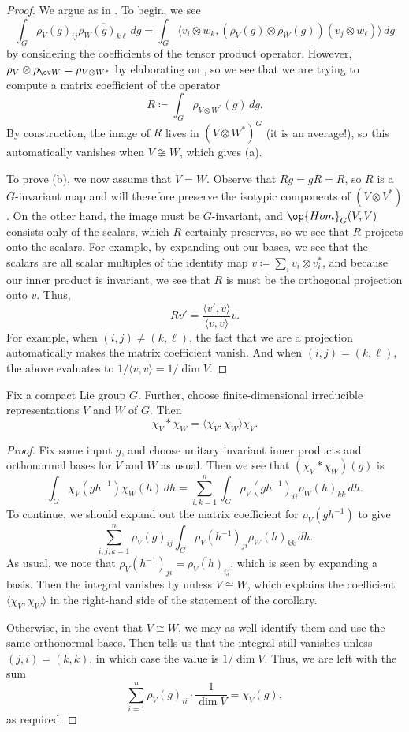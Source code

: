 \documentclass[notes.tex]{subfiles}
\begin{document}
\begin{proof}
	We argue as in . To begin, we see
	\[\int_G\rho_V(g)_{ij}\overline{\rho_W(g)_{k\ell}}\,dg=\int_G\langle v_i\otimes w_k,(\rho_V(g)\otimes\rho_{\overline W}(g))(v_j\otimes w_\ell)\rangle\,dg\]
	by considering the coefficients of the tensor product operator. However, $\rho_V\otimes\rho_{\ov W}=\rho_{V\otimes W^*}$ by elaborating on , so we see that we are trying to compute a matrix coefficient of the operator
	\[R\coloneqq\int_G\rho_{V\otimes W^*}(g)\,dg.\]
	By construction, the image of $R$ lives in $(V\otimes W^*)^G$ (it is an average!), so this automatically vanishes when $V\not\cong W$, which gives (a).

	To prove (b), we now assume that $V=W$. Observe that $Rg=gR=R$, so $R$ is a $G$-invariant map and will therefore preserve the isotypic components of $(V\otimes V^*)$. On the other hand, the image must be $G$-invariant, and $\op{Hom}_G(V,V)$ consists only of the scalars, which $R$ certainly preserves, so we see that $R$ projects onto the scalars. For example, by expanding out our bases, we see that the scalars are all scalar multiples of the identity map $v\coloneqq\sum_iv_i\otimes v_i^*$, and because our inner product is invariant, we see that $R$ is must be the orthogonal projection onto $v$. Thus,
	\[Rv'=\frac{\langle v',v\rangle}{\langle v,v\rangle}v.\]
	For example, when $(i,j)\ne(k,\ell)$, the fact that we are a projection automatically makes the matrix coefficient vanish. And when $(i,j)=(k,\ell)$, the above evaluates to $1/\langle v,v\rangle=1/\dim V$.
\end{proof}
\begin{corollary} \label{cor:character-convolution}
	Fix a compact Lie group $G$. Further, choose finite-dimensional irreducible representations $V$ and $W$ of $G$. Then
	\[\chi_V*\chi_W=\langle\chi_V,\chi_W\rangle\chi_V.\]
\end{corollary}
\begin{proof}
	Fix some input $g$, and choose unitary invariant inner products and orthonormal bases for $V$ and $W$ as usual. Then we see that $(\chi_V*\chi_W)(g)$ is
	\[\int_G\chi_V\left(gh^{-1}\right)\chi_W(h)\,dh=\sum_{i,k=1}^n\int_G\rho_V\left(gh^{-1}\right)_{ii}\rho_W(h)_{kk}\,dh.\]
	To continue, we should expand out the matrix coefficient for $\rho_V\left(gh^{-1}\right)$ to give
	\[\sum_{i,j,k=1}^n\rho_V(g)_{ij}\int_G\rho_V\left(h^{-1}\right)_{ji}\rho_W(h)_{kk}\,dh.\]
	As usual, we note that $\rho_V\left(h^{-1}\right)_{ji}=\overline{\rho_V(h)}_{ij}$, which is seen by expanding a basis. Then the integral vanishes by  unless $V\cong W$, which explains the coefficient $\langle\chi_V,\chi_W\rangle$ in the right-hand side of the statement of the corollary.
	
	Otherwise, in the event that $V\cong W$, we may as well identify them and use the same orthonormal bases. Then  tells us that the integral still vanishes unless $(j,i)=(k,k)$, in which case the value is $1/\dim V$. Thus, we are left with the sum
	\[\sum_{i=1}^n\rho_V(g)_{ii}\cdot\frac1{\dim V}=\chi_V(g),\]
	as required.
\end{proof}
\end{document}
